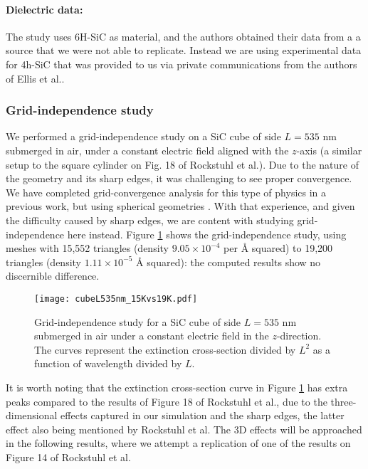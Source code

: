 \paragraph{Dielectric data:} The study uses 6H-SiC as material, and the authors obtained their data from a a source that we
were not able to replicate. Instead we are using experimental data for 4h-SiC that was provided to us 
via private communications from the authors of Ellis et al.\cite{ellis2016}.  

\subsubsection{Grid-independence study}\label{sec:independence}

We performed a grid-independence study on a SiC cube of side $L=535$ nm submerged in air, under a 
constant electric field aligned with the $z$-axis (a similar setup to the square cylinder on Fig. 18 of 
Rockstuhl et al.\cite{rockstuhl2005}). 
Due to the nature of the geometry and its sharp edges, it was challenging to see proper convergence. 
We have completed grid-convergence analysis for this type of physics in a previous work, but using spherical geometries \cite{ClementiETal2019}. 
With that experience, and given the difficulty caused by sharp edges, we are content with studying grid-independence here instead.
Figure \ref{fig:cube535} shows the grid-independence study, using meshes with  15,552 triangles (density $9.05\times10^{-4}$ per $\text{\AA}$ squared)
 to 19,200 triangles (density $1.11\times10^{-5}$ $\text{\AA}$ squared):
 the computed results show no discernible difference.

\begin{figure}
    \centering
    \texttt{[image: cubeL535nm\_15Kvs19K.pdf]} 
    \caption{Grid-independence study for a SiC cube of side $L=535$ nm submerged in air under a constant 
    electric field in the $z$-direction. The curves represent the extinction cross-section divided by $L^2$ 
    as a function of wavelength divided by $L$.}
    \label{fig:cube535}
 \end{figure}

It is worth noting that the extinction cross-section curve in Figure \ref{fig:cube535} has extra peaks 
compared to the results of Figure 18 of Rockstuhl et al., due to the three-dimensional effects captured in our simulation and the sharp 
edges, the latter effect also being mentioned by Rockstuhl et al. The 3D effects will be approached
in the following results, where we attempt a replication of one of the results on Figure 14 of Rockstuhl et al. 


